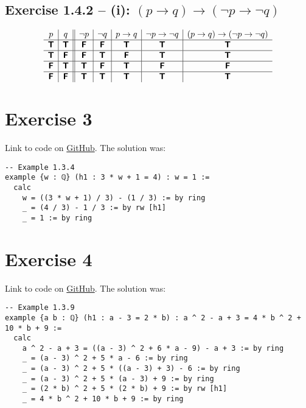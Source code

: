 \documentclass[11pt]{article}
\newcommand{\TTT}{\bm{\mathsf{T}}}
\newcommand{\FFF}{\bm{\mathsf{F}}}
\begin{document}
\subsection*{Exercise 1.4.2 -- (i): $(p \to q) \to (\neg{p} \to \neg{q})$}
\[
\begin{array}{ c | c || c | c | c | c | c}
 p & q & \neg{p} & \neg{q}& p \to q & \neg{p} \to \neg{q} & (p \to q) \to (\neg{p} \to \neg{q})
\\ \hline 
 \TTT & \TTT & \FFF & \FFF & \TTT & \TTT & \TTT \\ \hline  
 \TTT & \FFF & \FFF & \TTT & \FFF & \TTT & \TTT \\ \hline  
 \FFF & \TTT & \TTT & \FFF & \TTT & \FFF & \FFF \\ \hline  
 \FFF & \FFF & \TTT & \TTT & \TTT & \TTT & \TTT
\end{array}
\]

\section*{Exercise 3}
Link to code on \href{https://github.com/lucastassis/BU-CS511/HW01/code/HW01.lean}{GitHub}. The solution was:

\begin{lstlisting}
-- Example 1.3.4
example {w : ℚ} (h1 : 3 * w + 1 = 4) : w = 1 :=
  calc
    w = ((3 * w + 1) / 3) - (1 / 3) := by ring
    _ = (4 / 3) - 1 / 3 := by rw [h1]
    _ = 1 := by ring
\end{lstlisting}

\section*{Exercise 4}
Link to code on \href{https://github.com/lucastassis/BU-CS511/HW01/code/HW01.lean}{GitHub}. The solution was: 

\begin{lstlisting}
-- Example 1.3.9
example {a b : ℚ} (h1 : a - 3 = 2 * b) : a ^ 2 - a + 3 = 4 * b ^ 2 + 10 * b + 9 :=
  calc
    a ^ 2 - a + 3 = ((a - 3) ^ 2 + 6 * a - 9) - a + 3 := by ring
    _ = (a - 3) ^ 2 + 5 * a - 6 := by ring
    _ = (a - 3) ^ 2 + 5 * ((a - 3) + 3) - 6 := by ring
    _ = (a - 3) ^ 2 + 5 * (a - 3) + 9 := by ring
    _ = (2 * b) ^ 2 + 5 * (2 * b) + 9 := by rw [h1]
    _ = 4 * b ^ 2 + 10 * b + 9 := by ring
\end{lstlisting}
\end{document}
